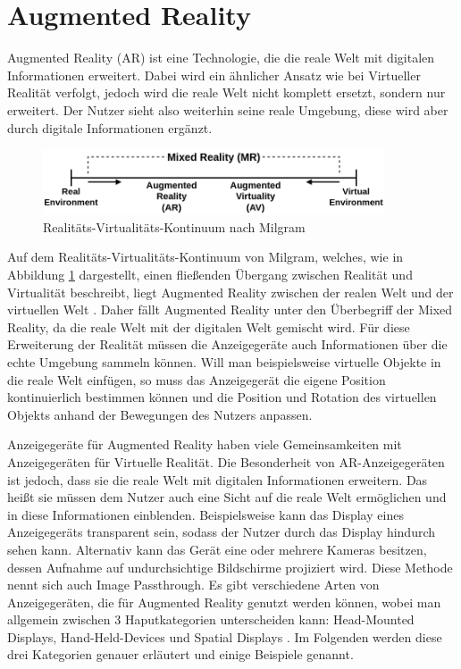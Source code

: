   \section{Augmented Reality}
  Augmented Reality (AR) ist eine Technologie, die die reale Welt mit digitalen Informationen erweitert.
  Dabei wird ein ähnlicher Ansatz wie bei Virtueller Realität verfolgt, jedoch wird die reale Welt nicht komplett ersetzt, sondern nur erweitert.
  Der Nutzer sieht also weiterhin seine reale Umgebung, diese wird aber durch digitale Informationen ergänzt.
  \begin{figure}[H]
    \centering
    \includegraphics[width=0.9\textwidth]{images/RV-Continuum.png}
    \caption{Realitäts-Virtualitäts-Kontinuum nach Milgram}
    \label{fig:rv-continuum}
  \end{figure}
  Auf dem Realitäts-Virtualitäts-Kontinuum von Milgram, welches, wie in Abbildung \ref{fig:rv-continuum} dargestellt, einen fließenden Übergang zwischen Realität und Virtualität beschreibt, liegt Augmented Reality zwischen der realen Welt und der virtuellen Welt \autocite[vgl.][S.9]{milgram1999}.
  Daher fällt Augmented Reality unter den Überbegriff der Mixed Reality, da die reale Welt mit der digitalen Welt gemischt wird.
  Für diese Erweiterung der Realität müssen die Anzeigegeräte auch Informationen über die echte Umgebung sammeln können.
  Will man beispielsweise virtuelle Objekte in die reale Welt einfügen, so muss das Anzeigegerät die eigene Position kontinuierlich bestimmen können und die Position und Rotation des virtuellen Objekts anhand der Bewegungen des Nutzers anpassen.

  Anzeigegeräte für Augmented Reality haben viele Gemeinsamkeiten mit Anzeigegeräten für Virtuelle Realität.
  Die Besonderheit von AR-Anzeigegeräten ist jedoch, dass sie die reale Welt mit digitalen Informationen erweitern.
  Das heißt sie müssen dem Nutzer auch eine Sicht auf die reale Welt ermöglichen und in diese Informationen einblenden.
  Beispielsweise kann das Display eines Anzeigegeräts transparent sein, sodass der Nutzer durch das Display hindurch sehen kann.
  Alternativ kann das Gerät eine oder mehrere Kameras besitzen, dessen Aufnahme auf undurchsichtige Bildschirme projiziert wird.
  Diese Methode nennt sich auch Image Passthrough.
  Es gibt verschiedene Arten von Anzeigegeräten, die für Augmented Reality genutzt werden können, wobei man allgemein zwischen 3 Haputkategorien unterscheiden kann: Head-Mounted Displays, Hand-Held-Devices und Spatial Displays \autocite[][S. 346]{Carmigniani2011}.
  Im Folgenden werden diese drei Kategorien genauer erläutert und einige Beispiele genannt.

